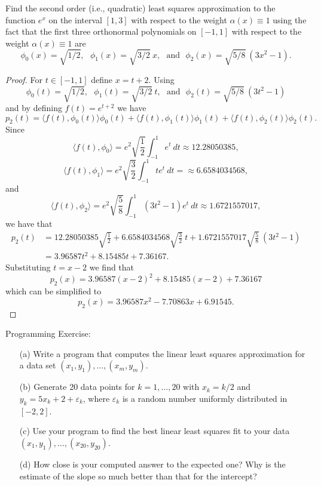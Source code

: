 \documentclass[8pt]{article}
\theoremstyle{definition}
\newenvironment{exercise}[1]
  {\renewcommand\theinnerexercise{#1}\innerexercise}
  {\endinnerexercise}
\begin{document}
\begin{exercise}{3}
Find the second order (i.e., quadratic) least squares approximation to the function $e^x$ on the interval $[1, 3]$ with respect to the weight $\alpha(x) \equiv 1$ using the fact that the first three orthonormal polynomials on $[-1, 1]$ with respect to the weight $\alpha(x) \equiv 1$ are $$\phi_0 (x) = \sqrt{1/2}, \ \ \ \phi_1 (x) = \sqrt{3/2} \ x, \ \ \ \text{and} \ \ \ \phi_2 (x) = \sqrt{5/8} \ (3 x^2 - 1).$$
\end{exercise}

\begin{proof}
For $t \in [-1, 1]$ define $x = t + 2$. Using $$\phi_0 (t) = \sqrt{1/2}, \ \ \ \phi_1 (t) = \sqrt{3/2} \ t, \ \ \ \text{and} \ \ \ \phi_2 (t) = \sqrt{5/8} \ (3t^2 - 1)$$ and by defining $f(t) = e^{t + 2}$ we have $$p_2 (t) = \langle f(t), \phi_0 (t) \rangle \phi_0 (t) + \langle f(t), \phi_1 (t) \rangle \phi_1 (t) + \langle f(t), \phi_2 (t) \rangle \phi_2 (t).$$ Since $$\langle f(t), \phi_0 \rangle = e^2 \sqrt{\frac{1}{2}} \int_{-1}^{1} e^t \ dt \approx 12.28050385,$$ $$\langle f(t), \phi_1 \rangle = e^2 \sqrt{\frac{3}{2}} \int_{-1}^{1} t e^t \ dt = \approx 6.6584034568,$$ and $$\langle f(t), \phi_2 \rangle = e^2 \sqrt{\frac{5}{8}} \int_{-1}^{1} (3t^2 - 1) e^t \ dt \approx 1.6721557017,$$ we have that 
\begin{align*}
p_2 (t) &= 12.28050385 \sqrt{\frac{1}{2}} + 6.6584034568 \sqrt{\frac{3}{2}} \ t + 1.6721557017 \sqrt{\frac{5}{8}} \ (3t^2 - 1) \\
&= 3.96587 t^2 + 8.15485 t + 7.36167.
\end{align*}
Substituting $t = x - 2$ we find that $$p_2 (x) = 3.96587 (x - 2)^2 + 8.15485 (x - 2) + 7.36167$$ which can be simplified to $$p_2 (x) = 3.96587 x^2 - 7.70863 x + 6.91545.$$
\end{proof}


\begin{exercise}{4}
Programming Exercise:
\begin{enumerate}
\item[(a)] Write a program that computes the linear least squares approximation for a data set $(x_1, y_1), \ldots, (x_m, y_m)$. 
\item[(b)] Generate 20 data points for $k = 1, \ldots, 20$ with $x_k = k/2$ and $y_k = 5 x_k + 2 + \varepsilon_k$, where $\varepsilon_k$ is a random number uniformly distributed in $[-2, 2]$.
\item[(c)] Use your program to find the best linear least squares fit to your data $(x_1, y_1), \ldots, (x_{20}, y_{20})$.
\item[(d)] How close is your computed answer to the expected one? Why is the estimate of the slope so much better than that for the intercept?
\end{enumerate}
\end{exercise}
\end{document}
